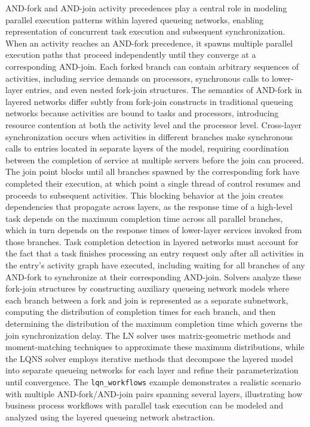 AND-fork and AND-join activity precedences play a central role in modeling parallel execution patterns within layered queueing networks, enabling representation of concurrent task execution and subsequent synchronization. When an activity reaches an AND-fork precedence, it spawns multiple parallel execution paths that proceed independently until they converge at a corresponding AND-join. Each forked branch can contain arbitrary sequences of activities, including service demands on processors, synchronous calls to lower-layer entries, and even nested fork-join structures. The semantics of AND-fork in layered networks differ subtly from fork-join constructs in traditional queueing networks because activities are bound to tasks and processors, introducing resource contention at both the activity level and the processor level. Cross-layer synchronization occurs when activities in different branches make synchronous calls to entries located in separate layers of the model, requiring coordination between the completion of service at multiple servers before the join can proceed. The join point blocks until all branches spawned by the corresponding fork have completed their execution, at which point a single thread of control resumes and proceeds to subsequent activities. This blocking behavior at the join creates dependencies that propagate across layers, as the response time of a high-level task depends on the maximum completion time across all parallel branches, which in turn depends on the response times of lower-layer services invoked from those branches. Task completion detection in layered networks must account for the fact that a task finishes processing an entry request only after all activities in the entry's activity graph have executed, including waiting for all branches of any AND-fork to synchronize at their corresponding AND-join. Solvers analyze these fork-join structures by constructing auxiliary queueing network models where each branch between a fork and join is represented as a separate subnetwork, computing the distribution of completion times for each branch, and then determining the distribution of the maximum completion time which governs the join synchronization delay. The LN solver uses matrix-geometric methods and moment-matching techniques to approximate these maximum distributions, while the LQNS solver employs iterative methods that decompose the layered model into separate queueing networks for each layer and refine their parameterization until convergence. The \texttt{lqn\_workflows} example demonstrates a realistic scenario with multiple AND-fork/AND-join pairs spanning several layers, illustrating how business process workflows with parallel task execution can be modeled and analyzed using the layered queueing network abstraction.

